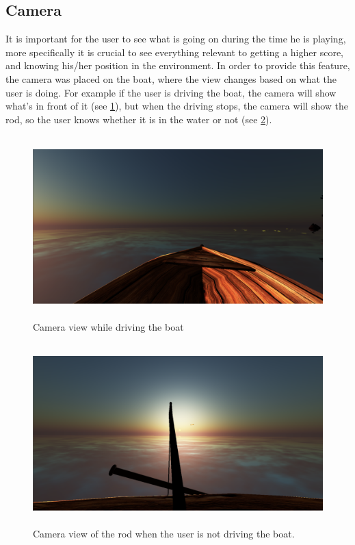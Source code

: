 \documentclass[paper=a4, fontsize=11pt]{scrartcl} %
\numberwithin{equation}{section} %
\numberwithin{figure}{section} %
\numberwithin{table}{section} %
\begin{document}
\subsection{Camera}

It is important for the user to see what is going on during the time he is playing, more specifically it is crucial to see everything relevant to getting a higher score, and knowing his/her position in the environment. In order to provide this feature, the camera was placed on the boat, where the view changes based on what the user is doing. For example if the user is driving the boat, the camera will show what's in front of it (see \ref{boat view}), but when the driving stops, the camera will show the rod, so the user knows whether it is in the water or not (see \ref{Urod}).

\begin{figure}[!ht]
\centering
\includegraphics[width=15cm, height=7cm]{images/boatview.png}
\caption{Camera view while driving the boat}
\label{boat view}
\end{figure}

\begin{figure}[!ht]
\centering
\includegraphics[width=15cm, height=7cm]{images/pulledrod.png}
\caption{Camera view of the rod when the user is not driving the boat.}
\label{Urod}
\end{figure}
\newpage
\end{document}
